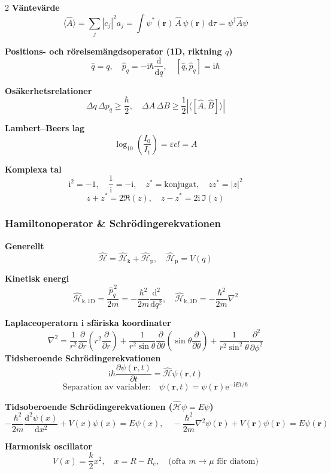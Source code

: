 \documentclass[10pt,a4paper]{article}
\newcommand{\dd}{\mathrm{d}}
\newcommand{\ii}{\mathrm{i}}
\newcommand{\e}{\mathrm{e}}
\newcommand{\HH}{\widehat{\mathcal{H}}}
\newcommand{\Hk}{\widehat{\mathcal{H}}_{\mathrm{k}}}
\newcommand{\Hp}{\widehat{\mathcal{H}}_{\mathrm{p}}}
\begin{document}
\begin{multicols*}{2}
\textbf{V\"antev\"arde}
\[
\langle \hat A\rangle=\sum_j |c_j|^2 a_j
=\int\!\psi^*(\mathbf r)\,\hat A\,\psi(\mathbf r)\,\dd\tau
=\psi^\dagger\hat A\psi
\]

\textbf{Positions- och r\"orelsem\"angdsoperator (1D, riktning $q$)}
\[
\hat q=q,\quad \hat p_q=-\ii\hbar\frac{\dd}{\dd q},\quad [\hat q,\hat p_q]=\ii\hbar
\]

\textbf{Os\"akerhetsrelationer}
\[
\Delta q\,\Delta p_q\ge \frac{\hbar}{2},\quad
\Delta A\,\Delta B\ge \frac{1}{2}\left|\langle[\hat A,\hat B]\rangle\right|
\]

\textbf{Lambert--Beers lag}
\[
\log_{10}\!\left(\frac{I_0}{I_t}\right)=\varepsilon c l = A
\]

\textbf{Komplexa tal}
\[
\ii^2=-1,\quad \frac{1}{\ii}=-\ii,\quad z^*=\text{konjugat},\quad zz^*=|z|^2
\]\[
z+z^*=2\Re(z),\quad z-z^*=2\ii\,\Im(z)
\]

\subsubsection*{Hamiltonoperator \& Schr\"odingerekvationen}

\textbf{Generellt}
\[
\HH=\Hk+\Hp,\quad \Hp=V(q)
\]

\textbf{Kinetisk energi}
\[
\widehat{\mathcal{H}}_{\mathrm{k},\text{1D}}=\frac{\hat p_q^{\,2}}{2m}=-\frac{\hbar^2}{2m}\frac{\dd^2}{\dd q^2},\quad
\widehat{\mathcal{H}}_{\mathrm{k},\text{3D}}=-\frac{\hbar^2}{2m}\nabla^2
\]

\textbf{Laplaceoperatorn i sf\"ariska koordinater}
\[
\nabla^2 =
\frac{1}{r^2}\frac{\partial}{\partial r}
\left(r^2\frac{\partial}{\partial r}\right)
+
\frac{1}{r^2\sin\theta}
\frac{\partial}{\partial\theta}
\left(\sin\theta \frac{\partial}{\partial\theta}\right)
+
\frac{1}{r^2\sin^2\theta}
\frac{\partial^2}{\partial\phi^2}
\]
\textbf{Tidsberoende Schr\"odingerekvationen}
\[
\ii\hbar \frac{\partial \psi(\mathbf r,t)}{\partial t}
=
\HH \psi(\mathbf r,t)
\]
\[
\text{Separation av variabler:}\quad
\psi(\mathbf r,t)=\psi(\mathbf r)\e^{-\ii Et/\hbar}
\]

\textbf{Tidsoberoende Schr\"odingerekvationen ($\HH\psi=E\psi$)}
\[
-\frac{\hbar^2}{2m}\frac{\dd^2\psi(x)}{\dd x^2}+V(x)\psi(x)=E\psi(x),\quad
-\frac{\hbar^2}{2m}\nabla^2\psi(\mathbf r)+V(\mathbf r)\psi(\mathbf r)=E\psi(\mathbf r)
\]

\textbf{Harmonisk oscillator}
\[
V(x)=\frac{k}{2}x^2,\quad x=R-R_e,\quad \text{(ofta }m\to\mu\text{ f\"or diatom)}
\]


\end{multicols*}
\end{document}
